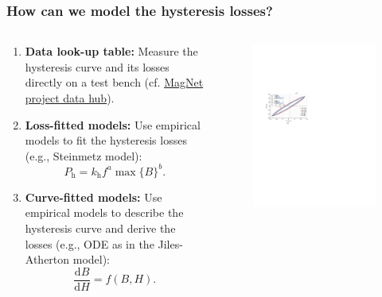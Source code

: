 \begin{frame}
	\frametitle{How can we model the hysteresis losses?}
	\begin{columns}
		\begin{column}{0.5\textwidth}
            \vspace{-0.15cm}
            \begin{enumerate}
                \item \textbf{Data look-up table:} Measure the hysteresis curve and its losses directly on a test bench (cf. \href{https://www.princeton.edu/~minjie/magnet.html}{MagNet project data hub}).
                \item \textbf{Loss-fitted models:} Use empirical models to fit the hysteresis losses (e.g., Steinmetz model):
                $$P_{\mathrm{h}} = k_{\mathrm{h}}f^a \max\{B\}^b.$$
                \item \textbf{Curve-fitted models:} Use empirical models to describe the hysteresis curve and derive the losses (e.g., ODE as in the Jiles-Atherton model):
                $$\frac{\mathrm{d}B}{\mathrm{d}H} = f(B,H).$$
            \end{enumerate}
		\end{column}
        \hfill
		\begin{column}{0.475\textwidth}
            \vspace{-0.2cm}
			\begin{figure}
				\centering
				\includegraphics[height=0.55\textheight]{fig/lec02/Hysteresis_curve_Serrano_et_al.pdf}

\end{figure}
\end{column}
\end{columns}
\end{frame}
